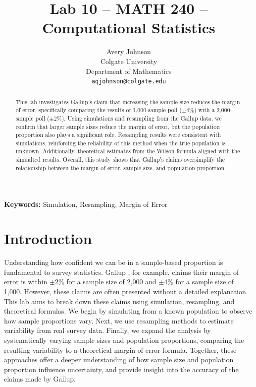 \documentclass{article}\usepackage[]{graphicx}\usepackage[]{xcolor}
\begin{document}
\vspace{-1in}
\title{Lab 10 -- MATH 240 -- Computational Statistics}

\author{
  Avery Johnson \\
  Colgate University  \\
  Department of Mathematics  \\
  {\tt aqjohnson@colgate.edu}
}

\date{}

\maketitle

\begin{multicols}{2}
\begin{abstract}
This lab investigates Gallup's \citep{gallup} claim that increasing the sample size reduces
the margin of error, specifically comparing the results of 1,000-sample poll ($\pm 4\%$)
with a 2,000-sample poll ($\pm 2\%$). Using simulations and resampling from the
Gallup data, we confirm that larger sample sizes reduce the margin of error, but
the population proportion also plays a significant role. Resampling results were
consistent with simulations, reinforcing the reliability of this method when
the true population is unknown. Additionally, theoretical estimates from the Wilson
formula aligned with the simualted results. Overall, this study shows that Gallup's
claims oversimplify the relationship between the margin of error, sample size, and 
population proportion.

\end{abstract}

\noindent \textbf{Keywords:} Simulation, Resampling, Margin of Error

\section{Introduction}
Understanding how confident we can be in a sample-based proportion is fundamental
to survey statistics. Gallup \citep{gallup}, for example, claims their margin of error is within $\pm 2\%$ for a sample size of 2,000 and $\pm 4\%$ for a sample size of 1,000.
However, these claims are often presented without a detailed explanation.
This lab aims to break down these claims using simulation, resampling, and theoretical formulas. We begin by simulating from a known population to observe how sample
proportions vary. Next, we use resampling methods to estimate variability from real survey data. Finally, we expand the analysis by systematically varying sample sizes and
population proportions, comparing the resulting variability to a theoretical
margin of error formula. Together, these approaches offer a deeper understanding
of how sample size and population proportion influence uncertainty, and provide 
insight into the accuracy of the claims made by Gallup.


\end{multicols}
\end{document}
